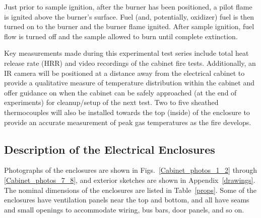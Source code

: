 \documentclass[12pt]{article}
\begin{document}
Just prior to sample ignition, after the burner has been positioned, a pilot flame is ignited above the burner’s surface. Fuel (and, potentially, oxidizer) fuel is then turned on to the burner and the burner flame ignited. After sample ignition, fuel flow is turned off and the sample allowed to burn until complete extinction.

Key measurements made during this experimental test series include total heat release rate (HRR) and video recordings of the cabinet fire tests. Additionally, an IR camera will be positioned at a distance away from the electrical cabinet to provide a qualitative measure of temperature distribution within the cabinet and offer guidance on when the cabinet can be safely approached (at the end of experiments) for cleanup/setup of the next test. Two to five sheathed thermocouples will also be installed towards the top (inside) of the enclosure to provide an accurate measurement of peak gas temperatures as the fire develops.



\subsection{Description of the Electrical Enclosures}

Photographs of the enclosures are shown in Figs.~\ref{Cabinet_photos_1_2} through \ref{Cabinet_photos_7_8}, and exterior sketches are shown in Appendix~\ref{drawings}. The nominal dimensions of the enclosures are listed in Table~\ref{props}. Some of the enclosures have ventilation panels near the top and bottom, and all have seams and small openings to accommodate wiring, bus bars, door panels, and so on.
\end{document}
